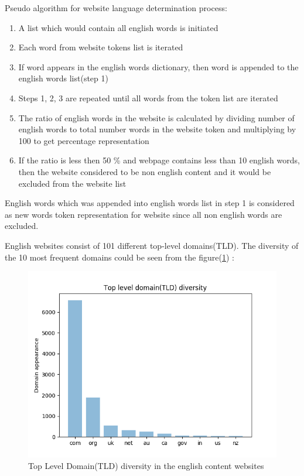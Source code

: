 Pseudo algorithm for website language determination process:
\begin{enumerate}
    \item A list which would contain all english words is initiated
    \item Each word from website tokens list is iterated
    \item If word appears in the english words dictionary, then word is appended to the english words list(step 1)
    \item Steps 1, 2, 3 are repeated until all words from the token list are iterated
    \item The ratio of english words in the website is calculated by dividing number of english words to total number words in the website token and multiplying by 100 to get percentage representation
    \item If the ratio is less then 50 \% and webpage contains less than 10 english words, then the website considered to be non english content and it would be excluded from the website list
\end{enumerate}
English words which was appended into english words list in step 1 is considered as new words token representation for website since all non english words are excluded.

English websites consist of 101 different top-level domains(TLD). The diversity of the 10 most frequent domains could be seen from the figure(\ref{fig:domain_diversity}) :

\begin{figure}[H]
    \centering
    \includegraphics[width=1\textwidth]{Pictures/domain_diversity.png}
    \caption{\label{fig:domain_diversity}{}Top Level Domain(TLD) diversity in the english content websites}
\end{figure}

